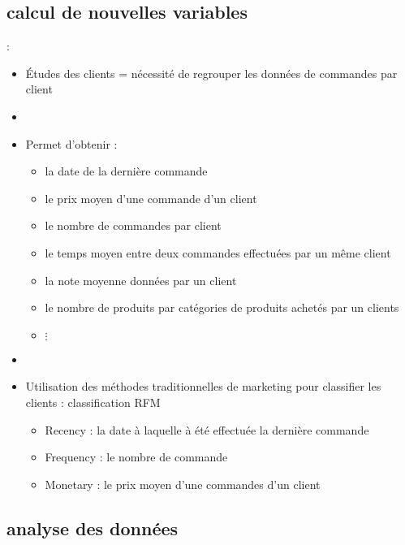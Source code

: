 \documentclass[8pt,aspectratio=169,hyperref={unicode=true}]{beamer}
\begin{document}
\subsection{calcul de nouvelles variables}
\begin{frame}{\insertsection: \insertsubsection}
    \begin{itemize}
        \item Études des clients = nécessité de regrouper les données de commandes par client
        \item[]
        \item Permet d'obtenir :
              \begin{itemize}
                  \item la date de la dernière commande
                  \item le prix moyen d'une commande d'un client
                  \item le nombre de commandes par client
                  \item le temps moyen entre deux commandes effectuées par un même client
                  \item la note moyenne données par un client
                  \item le nombre de produits par catégories de produits achetés par un clients
                  \item[] $\vdots$
              \end{itemize}
        \item[]
        \item Utilisation des méthodes traditionnelles de marketing pour classifier les clients : classification RFM
              \begin{itemize}
                  \item Recency : la date à laquelle à été effectuée la dernière commande
                  \item Frequency : le nombre de commande
                  \item Monetary : le prix moyen d'une commandes d'un client
              \end{itemize}
    \end{itemize}
\end{frame}

\subsection{analyse des données}
\end{document}
